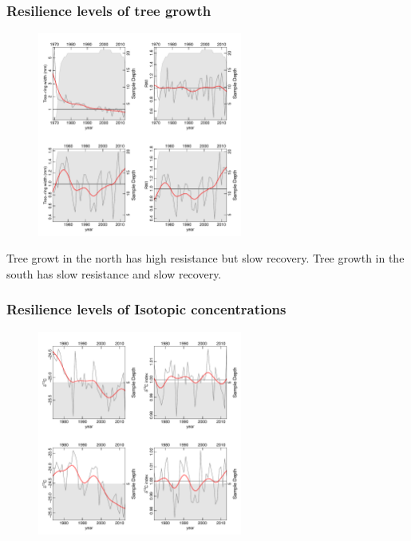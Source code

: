 \documentclass{beamer}
\begin{document}
\begin{frame}
\frametitle{Resilience levels of tree growth}
\begin{figure}
\includegraphics[width = 0.6\textwidth]{RWIs}
\end{figure}
Tree growt in the north has high resistance but slow recovery. Tree
growth in the south has slow resistance and slow recovery.
\end{frame}

\begin{frame}
  \frametitle{Resilience levels of Isotopic concentrations}
\begin{figure}
\includegraphics[width = 0.6\textwidth]{ideltas}
\end{figure}
\end{frame}
\end{document}
